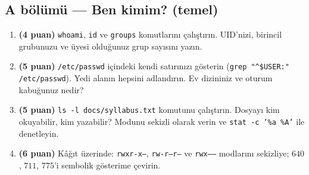 \documentclass[11pt,a4paper]{article}
\newcommand{\cmd}[1]{\texttt{#1}}
\begin{document}
\subsection*{A bölümü --- Ben kimim? (temel)}
\begin{enumerate}[leftmargin=1.8em,label=\textbf{\arabic*.}]
  \item \textbf{(4 puan)} \cmd{whoami}, \cmd{id} ve \cmd{groups} komutlarını çalıştırın. UID'nizi, birincil grubunuzu ve üyesi olduğunuz grup sayısını yazın.
  \item \textbf{(5 puan)} \texttt{/etc/passwd} içindeki kendi satırınızı gösterin (\cmd{grep "\^{}\$USER:" /etc/passwd}). Yedi alanın hepsini adlandırın. Ev dizininiz ve oturum kabuğunuz nedir?
  \item \textbf{(5 puan)} \cmd{ls -l docs/syllabus.txt} komutunu çalıştırın. Dosyayı kim okuyabilir, kim yazabilir? Modunu sekizli olarak verin ve \cmd{stat -c '\%a \%A'} ile denetleyin.
  \item \textbf{(6 puan)} Kâğıt üzerinde: \texttt{rwxr-x---}, \texttt{rw-r--r--} ve \texttt{rwx------} modlarını sekizliye; $640$, $711$, $775$'i sembolik gösterime çevirin.
\end{enumerate}
\end{document}
